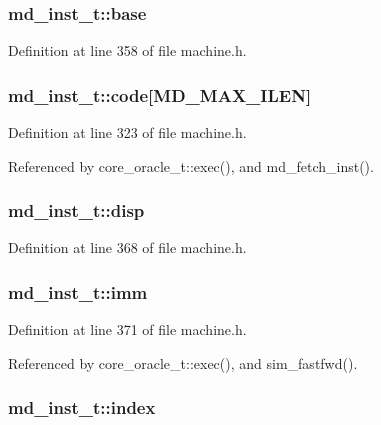 \subsubsection[{base}]{ {\bf md\_\-inst\_\-t::base}}\label{structmd__inst__t_185bcc50679e9871c25cac931e26db66}




Definition at line 358 of file machine.h.
\subsubsection[{code}]{ {\bf md\_\-inst\_\-t::code}[MD\_\-MAX\_\-ILEN]}\label{structmd__inst__t_cd464d5bc7356337ebd2ce89f968991c}




Definition at line 323 of file machine.h.

Referenced by core\_\-oracle\_\-t::exec(), and md\_\-fetch\_\-inst().
\subsubsection[{disp}]{ {\bf md\_\-inst\_\-t::disp}}\label{structmd__inst__t_9c5533fe622b1fe45dc7886470080893}




Definition at line 368 of file machine.h.
\subsubsection[{imm}]{ {\bf md\_\-inst\_\-t::imm}}\label{structmd__inst__t_b2f0a90d745653fcc0f7b2764407bb59}




Definition at line 371 of file machine.h.

Referenced by core\_\-oracle\_\-t::exec(), and sim\_\-fastfwd().
\subsubsection[{index}]{ {\bf md\_\-inst\_\-t::index}}\label{structmd__inst__t_7792377739a8a6e249604800a636e461}




